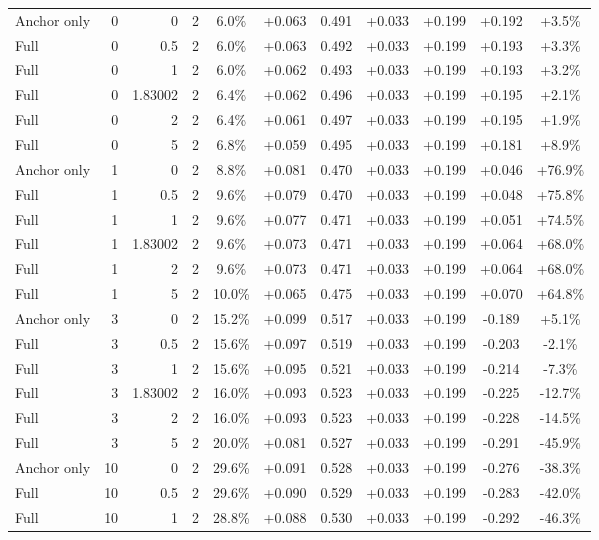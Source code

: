 \begin{table}[htbp]
\begin{tabular}{lrrrccccccc}
Anchor only & 0 & 0 & 2 & 6.0\% & +0.063 & 0.491 & +0.033 & +0.199 & +0.192 & +3.5\% \\
Full & 0 & 0.5 & 2 & 6.0\% & +0.063 & 0.492 & +0.033 & +0.199 & +0.193 & +3.3\% \\
Full & 0 & 1 & 2 & 6.0\% & +0.062 & 0.493 & +0.033 & +0.199 & +0.193 & +3.2\% \\
Full & 0 & 1.83002 & 2 & 6.4\% & +0.062 & 0.496 & +0.033 & +0.199 & +0.195 & +2.1\% \\
Full & 0 & 2 & 2 & 6.4\% & +0.061 & 0.497 & +0.033 & +0.199 & +0.195 & +1.9\% \\
Full & 0 & 5 & 2 & 6.8\% & +0.059 & 0.495 & +0.033 & +0.199 & +0.181 & +8.9\% \\
Anchor only & 1 & 0 & 2 & 8.8\% & +0.081 & 0.470 & +0.033 & +0.199 & +0.046 & +76.9\% \\
Full & 1 & 0.5 & 2 & 9.6\% & +0.079 & 0.470 & +0.033 & +0.199 & +0.048 & +75.8\% \\
Full & 1 & 1 & 2 & 9.6\% & +0.077 & 0.471 & +0.033 & +0.199 & +0.051 & +74.5\% \\
Full & 1 & 1.83002 & 2 & 9.6\% & +0.073 & 0.471 & +0.033 & +0.199 & +0.064 & +68.0\% \\
Full & 1 & 2 & 2 & 9.6\% & +0.073 & 0.471 & +0.033 & +0.199 & +0.064 & +68.0\% \\
Full & 1 & 5 & 2 & 10.0\% & +0.065 & 0.475 & +0.033 & +0.199 & +0.070 & +64.8\% \\
Anchor only & 3 & 0 & 2 & 15.2\% & +0.099 & 0.517 & +0.033 & +0.199 & -0.189 & +5.1\% \\
Full & 3 & 0.5 & 2 & 15.6\% & +0.097 & 0.519 & +0.033 & +0.199 & -0.203 & -2.1\% \\
Full & 3 & 1 & 2 & 15.6\% & +0.095 & 0.521 & +0.033 & +0.199 & -0.214 & -7.3\% \\
Full & 3 & 1.83002 & 2 & 16.0\% & +0.093 & 0.523 & +0.033 & +0.199 & -0.225 & -12.7\% \\
Full & 3 & 2 & 2 & 16.0\% & +0.093 & 0.523 & +0.033 & +0.199 & -0.228 & -14.5\% \\
Full & 3 & 5 & 2 & 20.0\% & +0.081 & 0.527 & +0.033 & +0.199 & -0.291 & -45.9\% \\
Anchor only & 10 & 0 & 2 & 29.6\% & +0.091 & 0.528 & +0.033 & +0.199 & -0.276 & -38.3\% \\
Full & 10 & 0.5 & 2 & 29.6\% & +0.090 & 0.529 & +0.033 & +0.199 & -0.283 & -42.0\% \\
Full & 10 & 1 & 2 & 28.8\% & +0.088 & 0.530 & +0.033 & +0.199 & -0.292 & -46.3\% \\

\end{tabular}
\end{table}
